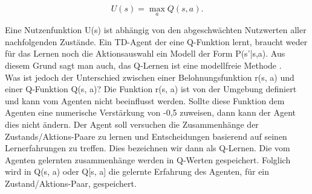 \begin{equation}
U(s) = \max_a Q(s,a).
\end{equation}

Eine Nutzenfunktion U(s) ist abhängig von den abgeschwächten Nutzwerten aller nachfolgenden Zustände. Ein TD-Agent der eine Q-Funktion lernt, braucht weder für das Lernen noch die Aktionsauswahl ein Modell der Form P(s'|s,a). Aus diesem Grund sagt man auch, das Q-Lernen ist eine modellfreie Methode \cite[974]{Russell}. \\

Was ist jedoch der Unterschied zwischen einer Belohnungsfunktion r(s, a) und einer Q-Funktion Q(s, a)? Die Funktion r(s, a) ist von der Umgebung definiert und kann vom Agenten nicht beeinflusst werden. Sollte diese Funktion dem Agenten eine numerische Verstärkung von -0,5 zuweisen, dann kann der Agent dies nicht ändern. Der Agent soll versuchen die Zusammenhänge der Zustands/Aktions-Paare zu lernen und Entscheidungen basierend auf seinen Lernerfahrungen zu treffen. Dies bezeichnen wir dann als Q-Lernen. Die vom Agenten gelernten zusammenhänge werden in Q-Werten gespeichert. Folglich wird in Q(s, a) oder Q[s, a] die gelernte Erfahrung des Agenten, für ein Zustand/Aktions-Paar, gespeichert. \\
